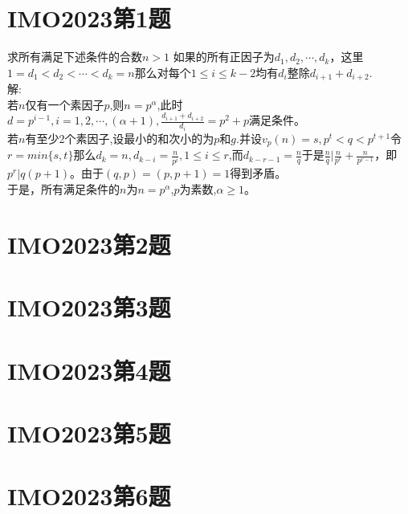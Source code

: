 \documentclass[12pt,twiside,a4paper]{ctexbook}
\numberwithin{chapter}{part}
\begin{document}

\section{IMO2023第1题}
求所有满足下述条件的合数$n>1$ 如果的所有正因子为$d_1,d_2,\cdots,d_k$，这里$1=d_1<d_2<\cdots<d_k=n$那么对每个$1\leq i\leq k-2$均有$d_i$整除$d_{i+1}+d_{i+2}$.\\
解:\\
若$n$仅有一个素因子$p$,则$n=p^\alpha$,此时$d=p^{i-1},i = 1,2,\cdots,(\alpha + 1),\frac{d_{i+1} + d_{i+2}}{d_i} = p^2 + p$满足条件。\\
若$n$有至少2个素因子,设最小的和次小的为$p$和$g$.并设$v_p(n) = s,p^t < q < p^{t + 1}$令$r=min\{s,t\}$那么$d_k = n,d_{k - i} = \frac{n}{p^i},1\leq i \leq r$,而$d_{k - r - 1} = \frac{n}{q}$于是$\frac{n}{q}|\frac{n}{p^r} + \frac{n}{p^{r-1}} $，即$p^r|q(p + 1)$。由于$(q,p)=(p,p+1) = 1$得到矛盾。\\
于是，所有满足条件的$n$为$n = p^\alpha$,$p$为素数,$\alpha \geq 1$。

\section{IMO2023第2题}

\section{IMO2023第3题}

\section{IMO2023第4题}

\section{IMO2023第5题}

\section{IMO2023第6题}


\clearpage
\end{document}
